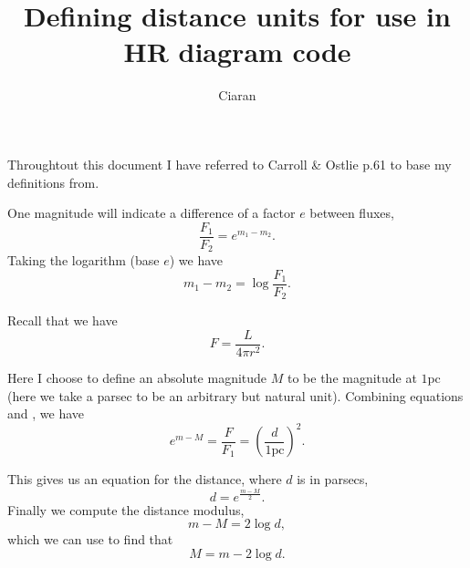 \documentclass[]{article}
\author{Ciaran}
\title{Defining distance units for use in HR diagram code}
\begin{document}
\maketitle

Throughtout this document I have referred to Carroll \& Ostlie p.61 to base my definitions from. 

One magnitude will indicate a difference of a factor \(e\) between fluxes,
\begin{equation}
    \frac{F_1}{F_2} = e^{m_1-m_2}. \label{eqn:flux ratio}
\end{equation}
Taking the logarithm (base \(e\)) we have 
\begin{equation}
    m_1-m_2 = \log \frac{F_1}{F_2}. \label{eqn:log flux ratio}
\end{equation}

Recall that we have
\begin{equation}
    F = \frac{L}{4\pi r^2}. \label{eqn:flux}
\end{equation}

Here I choose to define an absolute magnitude $M$ to be the magnitude at $1 \text{pc}$ (here we take a parsec to be an arbitrary but natural unit).
Combining equations  and , we have
\begin{equation}
    e^{m-M} = \frac{F}{F_1} = {\left(\frac{d}{1\text{pc}}\right)}^2.  
\end{equation}

This gives us an equation for the distance, where \(d\) is in parsecs,
\begin{equation}
    d = e^{\frac{m-M}{2}}.
\end{equation}
Finally we compute the distance modulus,
\begin{equation}
    m-M = 2 \log d,
\end{equation}
which we can use to find that 
\begin{equation}
    M = m - 2 \log d.
\end{equation}
\end{document}

